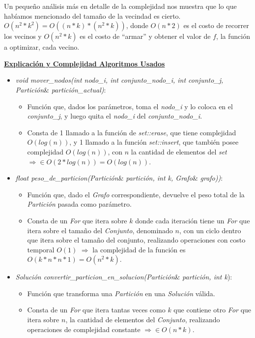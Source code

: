 \documentclass[10pt,a4paper]{article}
\begin{document}
Un pequeño análisis más en detalle de la complejidad nos muestra que lo que habíamos mencionado del tamaño de la vecindad es cierto. $O(n^2*k^2) = O((n*k)*(n^2*k))$, donde $O(n*2)$ es el costo de recorrer los vecinos y $O(n^2*k)$ es el costo de ``armar'' y obtener el valor de $f$, la función a optimizar, cada vecino.

\textbf{\underline{Explicación y Complejidad Algoritmos Usados}}

\begin{itemize}
\item \textit{void mover\_nodos(int nodo\_i, int conjunto\_nodo\_i, int conjunto\_j, Partición}\& \textit{partición\_actual)}:
\begin{itemize}
\item Función que, dados los parámetros, toma el \textit{nodo\_i} y lo coloca en el \textit{conjunto\_j}, y luego quita el \textit{nodo\_i} del \textit{conjunto\_nodo\_i}.
\item Consta de 1 llamado a la función de \textit{set::erase}, que tiene complejidad $O(log(n))$, y 1 llamado a la función \textit{set::insert}, que también posee complejidad $O(log(n))$, con $n$ la cantidad de elementos del \textit{set} $\Rightarrow \in O(2*log(n)) = O(log(n))$.
\end{itemize}
\item \textit{float peso\_de\_particion(Partición}\& \textit{partición, int k, Grafo}\& \textit{grafo))}:
\begin{itemize}
\item Función que, dado el \textit{Grafo} correspondiente, devuelve el peso total de la \textit{Partición} pasada como parámetro.
\item Consta de un \textit{For} que itera sobre $k$ donde cada iteración tiene un \textit{For} que itera sobre el tamaño del \textit{Conjunto}, denominado $n$, con un ciclo dentro que itera sobre el tamaño del conjunto, realizando operaciones con costo temporal $O(1)$ $\Rightarrow$ la complejidad de la función es $O(k*n*n*1) = O(n^2*k)$.
\end{itemize}
\item \textit{Solución convertir\_particion\_en\_solucion(Partición}\& \textit{partición, int k}):
\begin{itemize}
\item Función que transforma una \textit{Partición} en una \textit{Solución} válida.
\item Consta de un \textit{For} que itera tantas veces como $k$ que contiene otro \textit{For} que itera sobre $n$, la cantidad de elementos del \textit{Conjunto}, realizando operaciones de complejidad constante $\Rightarrow \in O(n*k)$.
\end{itemize}
\end{itemize}
\end{document}
